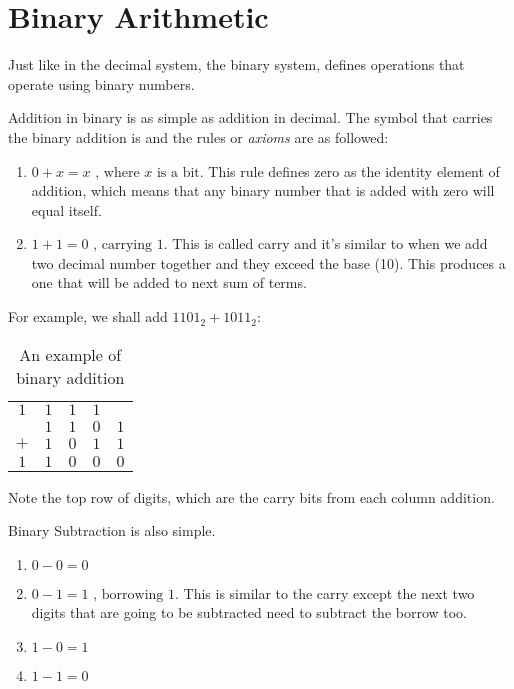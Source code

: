 \section{Binary Arithmetic}

Just like in the decimal system, the binary system, defines operations that operate
using binary numbers.

Addition in binary is as simple as addition in decimal. The symbol that carries the
binary addition is \say{$+$} and the rules or \textit{axioms} are as followed:

\begin{enumerate}
    \item $0 + x = x\text{ , where $x$ is a bit}$. This rule defines zero as the
    identity element of addition, which means that any binary number that is
    added with zero will equal itself.
    \item $1 + 1 = 0\text{ , carrying 1}$. This is called carry
    and it's similar to when we add two decimal number together and they
    exceed the base (10). This produces a one that will be added to next
    sum of terms.
\end{enumerate}

For example, we shall add $1101_2 + 1011_2$:

\begin{table}[ht]
    \centering
    \begin{tabular}{c cccc}
        $1$ & $1$   & $1$  & $1$  & \\
        $ $ & $1$  & $1$ & $0$ & $1$ \\
        $+$ & $1$ & $0$ & $1$ & $1$ \\
        \hline
        $1$ & $1$ & $0$ & $0$ & $0$ \\
    \end{tabular}
    \caption{An example of binary addition}
\end{table}

Note the top row of digits, which are the carry bits from each column addition.

Binary Subtraction is also simple.

\begin{enumerate}
    \item $0 - 0 = 0$
    \item $0 - 1 = 1\text{ , borrowing }1$. This is similar to the carry except
    the next two digits that are going to be subtracted need to subtract the borrow too.
    \item $1 - 0 = 1$
    \item $1 - 1 = 0$
\end{enumerate}

